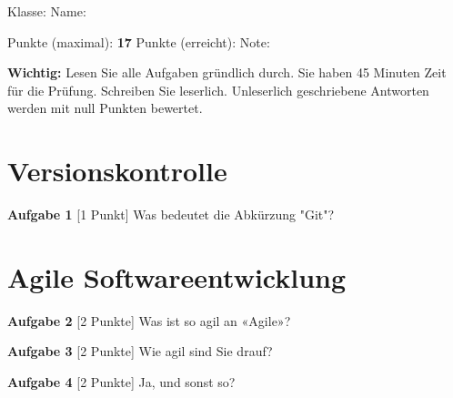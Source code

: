 \documentclass[a4paper,12pt]{scrartcl}
\begin{document}
\begin{large}
    Klasse: \underline{\hspace{6em}} \hspace{1em} Name: \underline{\hspace{17.5em}}

\vspace{14pt}

    Punkte (maximal): \textbf{17} \hspace{1em} Punkte (erreicht): \underline{\hspace{4em}} \hspace{1em} Note: \underline{\hspace{5em}}
\end{large}

\vspace{14pt}
\dotfill
\vspace{14pt}

\textbf{Wichtig:} Lesen Sie alle Aufgaben gründlich durch. Sie haben 45 Minuten Zeit für die Prüfung. Schreiben Sie leserlich. Unleserlich geschriebene Antworten werden mit null Punkten bewertet.

\section{Versionskontrolle}

\textbf{Aufgabe 1} [1 Punkt] Was bedeutet die Abkürzung "Git"?

\begin{LARGE}
    \hrulefill

    \hrulefill

    \hrulefill

\end{LARGE}

\section{Agile Softwareentwicklung}

\textbf{Aufgabe 2} [2 Punkte] Was ist so agil an «Agile»?

\begin{LARGE}
    \hrulefill

    \hrulefill

    \hrulefill

\end{LARGE}

\vspace{14pt}

\textbf{Aufgabe 3} [2 Punkte] Wie agil sind Sie drauf?

\begin{LARGE}
    \hrulefill

    \hrulefill

    \hrulefill

\end{LARGE}

\pagebreak

\textbf{Aufgabe 4} [2 Punkte] Ja, und sonst so?

\begin{LARGE}
    \hrulefill

    \hrulefill

    \hrulefill

\end{LARGE}
\end{document}
